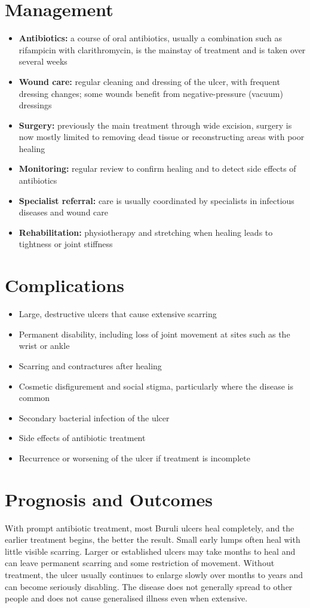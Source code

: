 \section*{Management}
\begin{itemize}
    \item \textbf{Antibiotics:} a course of oral antibiotics, usually a combination such as rifampicin with clarithromycin, is the mainstay of treatment and is taken over several weeks
    \item \textbf{Wound care:} regular cleaning and dressing of the ulcer, with frequent dressing changes; some wounds benefit from negative-pressure (vacuum) dressings
    \item \textbf{Surgery:} previously the main treatment through wide excision, surgery is now mostly limited to removing dead tissue or reconstructing areas with poor healing
    \item \textbf{Monitoring:} regular review to confirm healing and to detect side effects of antibiotics
    \item \textbf{Specialist referral:} care is usually coordinated by specialists in infectious diseases and wound care
    \item \textbf{Rehabilitation:} physiotherapy and stretching when healing leads to tightness or joint stiffness
\end{itemize}

\section*{Complications}
\begin{itemize}
    \item Large, destructive ulcers that cause extensive scarring
    \item Permanent disability, including loss of joint movement at sites such as the wrist or ankle
    \item Scarring and contractures after healing
    \item Cosmetic disfigurement and social stigma, particularly where the disease is common
    \item Secondary bacterial infection of the ulcer
    \item Side effects of antibiotic treatment
    \item Recurrence or worsening of the ulcer if treatment is incomplete
\end{itemize}

\section*{Prognosis and Outcomes}
With prompt antibiotic treatment, most Buruli ulcers heal completely, and the earlier treatment begins, the better the result. Small early lumps often heal with little visible scarring. Larger or established ulcers may take months to heal and can leave permanent scarring and some restriction of movement. Without treatment, the ulcer usually continues to enlarge slowly over months to years and can become seriously disabling. The disease does not generally spread to other people and does not cause generalised illness even when extensive.

